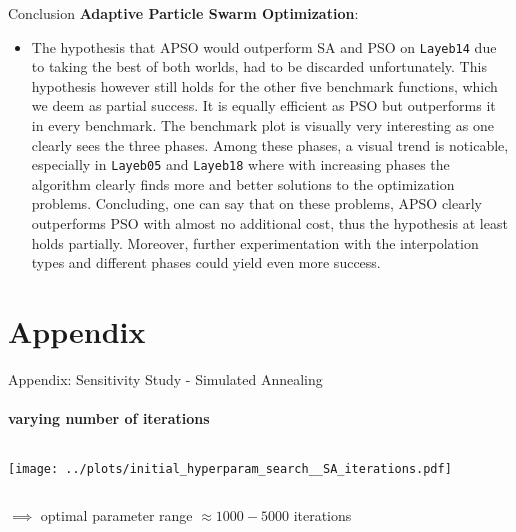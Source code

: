 \documentclass[11pt,aspectratio=169]{beamer}
\begin{document}
\begin{closingframe}{Conclusion}
    \textbf{Adaptive Particle Swarm Optimization}:
    \begin{itemize}
        \item The hypothesis that APSO would outperform SA and PSO on \texttt{Layeb14} due to taking the best of both worlds, had to be discarded unfortunately. This hypothesis however still holds for the other five benchmark functions, which we deem as partial success. It is equally efficient as PSO but outperforms it in every benchmark. The benchmark plot is visually very interesting as one clearly sees the three phases. Among these phases, a visual trend is noticable, especially in \texttt{Layeb05} and \texttt{Layeb18} where with increasing phases the algorithm clearly finds more and better solutions to the optimization problems. Concluding, one can say that on these problems, APSO clearly outperforms PSO with almost no additional cost, thus the hypothesis at least holds partially. Moreover, further experimentation with the interpolation types and different phases could yield even more success.
    \end{itemize}
\end{closingframe}

%
%

\section{Appendix}\label{sec:sensitivity_study_appendix}

\begin{closingframe}{Appendix: Sensitivity Study - Simulated Annealing}
    \framesubtitle{varying \textbf{number of iterations}}

    \begin{columns}
    \begin{column}{0.8\textwidth}
        \texttt{[image: ../plots/initial\_hyperparam\_search\_\_SA\_iterations.pdf]}
    \end{column}
    \end{columns}

    \begin{columns}
        \begin{column}{0.8\textwidth}
            $\implies$ optimal parameter range $\approx 1000-5000$ iterations
        \end{column}
        \begin{column}{0.1\textwidth}
            \tiny{}
        \end{column}
    \end{columns}

\end{closingframe}
\end{document}
